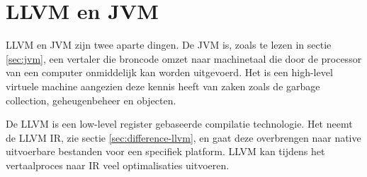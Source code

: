 \section{LLVM en JVM}
LLVM en JVM zijn twee aparte dingen. De JVM is, zoals te lezen in sectie \ref{sec:jvm}, een vertaler die broncode omzet naar machinetaal die door de processor van een computer onmiddelijk kan worden uitgevoerd. Het is een high-level virtuele machine aangezien deze kennis heeft van zaken zoals de garbage collection, geheugenbeheer en objecten.

De LLVM is een low-level register gebaseerde compilatie technologie. Het neemt de LLVM IR, zie sectie \ref{sec:difference-llvm}, en gaat deze overbrengen naar native uitvoerbare bestanden voor een specifiek platform. LLVM kan tijdens het vertaalproces naar IR veel optimalisaties uitvoeren.



